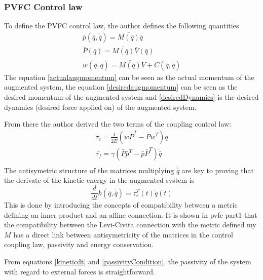 \subsubsection{PVFC Control law}
To define the PVFC control law, the author defines the following quantities
\begin{align}
    \bar{p}(\bar{q}, \dot{\bar{q}}) = \bar{M(\bar{q})}\dot{\bar{q}} \label{actualaugmomentum}\\
    \bar{P}(\bar{q}) = \bar{M(\bar{q})}\bar{V}(\bar{q}) \label{desiredaugmomentum}\\
    \bar{w(\bar{q}, \dot{\bar{q}})} = \bar{M(\bar{q})}\dot{\bar{V}} + \bar{C}(\bar{q}, \dot{\bar{q}}) \label{desiredDynamics}
\end{align}
The equation \ref{actualaugmomentum} can be seen as the actual momentum of the augmented system, the equation \ref{desiredaugmomentum} can be seen 
as the desired momentum of the augmented system and \ref{desiredDynamics} is the desired dynamics (desired force applied on) of the augmented system.


From there the author derived the two terms of the coupling control law: 
\begin{align}
    \bar{\tau_c} = \frac{1}{2\bar{E}}(\bar{w}\bar{P}^T - \bar{P}\bar{w}^T ) \dot{\bar{q}} \label{tauc}\\
    \bar{\tau_f} = \gamma(\bar{P}\bar{p}^T - \bar{p}\bar{P}^T ) \dot{\bar{q}} \label{tauf}\\
\end{align}
The antisymetric structure of the matrices multiplying $\dot{\bar{q}}$ are key to proving that the derivate of the kinetic energy in the augmented system is 
\begin{equation}
    \frac{d}{dt}k(\bar{q}, \dot{\bar{q}}) = \tau_e^T(t)\dot{q}(t) \label{kineticdt}
\end{equation}
This is done by introducing the concepts of compatibility between a metric defining an inner product and an affine connection. It is shown in pvfc part1 that the compatibility between the Levi-Civita connection with the metric defined my $M$ has a direct link between antisymetricity of the matrices in the control coupling law, passivity and energy conservation.

From equations \ref{kineticdt} and \ref{passivityCondition}, the passivity of the system with regard to external forces is straightforward.
